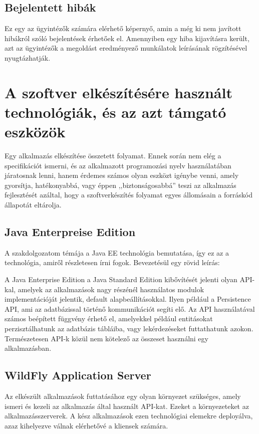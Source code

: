 \documentclass[centeredchapter]{thesis-ekf}
\theoremstyle{definition}
\theoremstyle{remark}
\begin{document}
\subsection{Bejelentett hibák}\hypertarget{leiras-bejelentetthibak}{}

Ez egy az ügyintézők számára elérhető képernyő, amin a még ki nem javított hibákról szóló bejelentések érhetőek el. Amennyiben egy hiba kijavításra került, azt az ügyintézők a megoldást eredményező munkálatok leírásának rögzítésével nyugtázhatják.

\section{A szoftver elkészítésére használt technológiák, és az azt támgató eszközök}

Egy alkalmazás elkészítése összetett folyamat. Ennek során nem elég a specifikációt ismerni, és az alkalmazott programozási nyelv használatában járatosnak lenni, hanem érdemes számos olyan eszközt igénybe venni, amely gyorsítja, hatékonyabbá, vagy éppen ,,biztonságosabbá'' teszi az alkalmazás fejlesztését azáltal, hogy a szoftverkészítés folyamat egyes állomásain a forráskód állapotát eltárolja.

\subsection{Java Enterpreise Edition}

A szakdolgozatom témája a Java EE technológia bemutatása, így ez az a technológia, amiről részletesen írni fogok. Bevezetésül egy rövid leírás:

A Java Enterprise Edition a Java Standard Edition kibővítését jelenti olyan API-kal, amelyek az alkalmazások nagy részénél használatos modulok implementációját jelentik, default alapbeállításokkal.
Ilyen például a Persistence API, ami az adatbázissal történő kommunikációt segíti elő. Az API használatával számos beépített függvény érhető el, amelyekkel például entitásokat perzisztálhatunk az adatbázis tábláiba, vagy lekérdezéseket futtathatunk azokon.
Természetesen API-k közül nem kötelező az összeset használni egy alkalmazásban.

\subsection{WildFly Application Server}

Az elkészült alkalmazások futtatásához egy olyan környezet szükséges, amely ismeri és kezeli az alkalmazás által használt API-kat. Ezeket a környezeteket az alkalmazásszerverek. 
A kész alkalmazások ezen technológiai elemekre deployálva, azaz kihelyezve válnak elérhetővé a kliensek számára.
\end{document}

